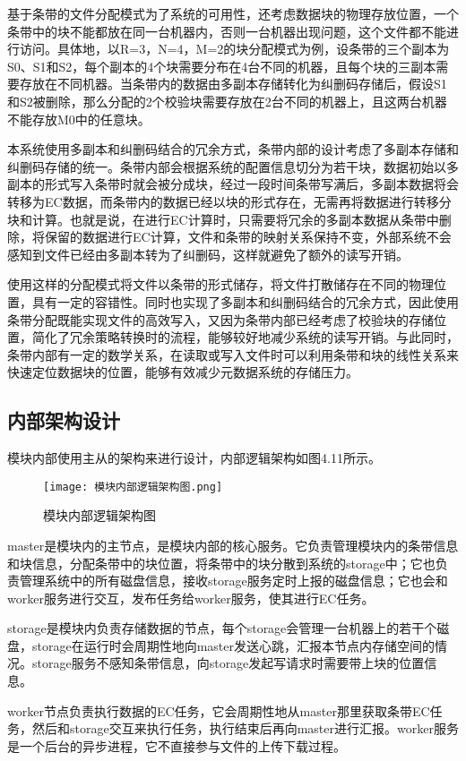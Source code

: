 基于条带的文件分配模式为了系统的可用性，还考虑数据块的物理存放位置，一个条带中的块不能都放在同一台机器内，否则一台机器出现问题，这个文件都不能进行访问。具体地，以R=3，N=4，M=2的块分配模式为例，设条带的三个副本为S0、S1和S2，每个副本的4个块需要分布在4台不同的机器，且每个块的三副本需要存放在不同机器。当条带内的数据由多副本存储转化为纠删码存储后，假设S1和S2被删除，那么分配的2个校验块需要存放在2台不同的机器上，且这两台机器不能存放M0中的任意块。

本系统使用多副本和纠删码结合的冗余方式，条带内部的设计考虑了多副本存储和纠删码存储的统一。条带内部会根据系统的配置信息切分为若干块，数据初始以多副本的形式写入条带时就会被分成块，经过一段时间条带写满后，多副本数据将会转移为EC数据，而条带内的数据已经以块的形式存在，无需再将数据进行转移分块和计算。也就是说，在进行EC计算时，只需要将冗余的多副本数据从条带中删除，将保留的数据进行EC计算，文件和条带的映射关系保持不变，外部系统不会感知到文件已经由多副本转为了纠删码，这样就避免了额外的读写开销。

使用这样的分配模式将文件以条带的形式储存，将文件打散储存在不同的物理位置，具有一定的容错性。同时也实现了多副本和纠删码结合的冗余方式，因此使用条带分配既能实现文件的高效写入，又因为条带内部已经考虑了校验块的存储位置，简化了冗余策略转换时的流程，能够较好地减少系统的读写开销。与此同时，条带内部有一定的数学关系，在读取或写入文件时可以利用条带和块的线性关系来快速定位数据块的位置，能够有效减少元数据系统的存储压力。

\subsection{内部架构设计}%
模块内部使用主从的架构来进行设计，内部逻辑架构如图4.11所示。

\begin{figure}[h]
  \centering
  \texttt{[image: 模块内部逻辑架构图.png]}
  \caption{模块内部逻辑架构图}
\end{figure}

master是模块内的主节点，是模块内部的核心服务。它负责管理模块内的条带信息和块信息，分配条带中的块位置，将条带中的块分散到系统的storage中；它也负责管理系统中的所有磁盘信息，接收storage服务定时上报的磁盘信息；它也会和worker服务进行交互，发布任务给worker服务，使其进行EC任务。

storage是模块内负责存储数据的节点，每个storage会管理一台机器上的若干个磁盘，storage在运行时会周期性地向master发送心跳，汇报本节点内存储空间的情况。storage服务不感知条带信息，向storage发起写请求时需要带上块的位置信息。

worker节点负责执行数据的EC任务，它会周期性地从master那里获取条带EC任务，然后和storage交互来执行任务，执行结束后再向master进行汇报。worker服务是一个后台的异步进程，它不直接参与文件的上传下载过程。


